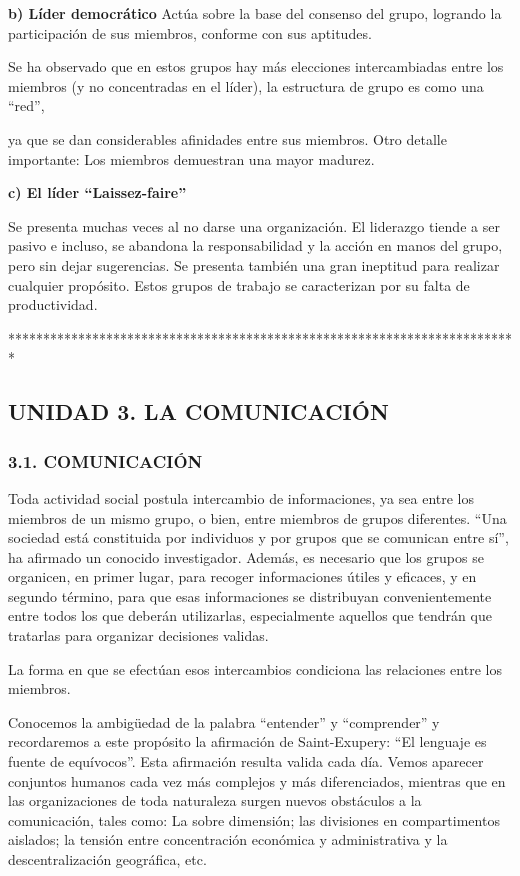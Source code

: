 \textbf{b) Líder democrático} Actúa sobre la base del consenso del grupo, logrando la participación de sus miembros, conforme con sus aptitudes.

Se ha observado que en estos grupos hay más elecciones intercambiadas entre los miembros (y no concentradas en el líder), la estructura de grupo es como una “red”,



ya que se dan considerables afinidades entre sus miembros. Otro detalle importante: Los miembros demuestran una mayor madurez.

\textbf{c) El líder “Laissez-faire”}

Se presenta muchas veces al no darse una organización. El liderazgo tiende a ser pasivo e incluso, se abandona la responsabilidad y la acción en manos del grupo, pero sin dejar sugerencias. Se presenta también una gran ineptitud para realizar cualquier propósito. Estos grupos de trabajo se caracterizan por su falta de productividad.

*************************************************************************



\subsection*{UNIDAD 3. LA COMUNICACIÓN}
\subsubsection*{3.1. COMUNICACIÓN}
Toda actividad social postula intercambio de informaciones, ya sea entre los miembros de un mismo grupo, o bien, entre miembros de grupos diferentes. “Una sociedad está constituida por individuos y por grupos que se comunican entre sí”, ha afirmado un conocido investigador. Además, es necesario que los grupos se organicen, en primer lugar, para recoger informaciones útiles y eficaces, y en segundo término, para que esas informaciones se distribuyan convenientemente entre todos los que deberán utilizarlas, especialmente aquellos que tendrán que tratarlas para organizar decisiones validas.

La forma en que se efectúan esos intercambios condiciona las relaciones entre los miembros.

Conocemos la ambigüedad de la palabra “entender” y “comprender” y recordaremos a este propósito la afirmación de Saint-Exupery: “El lenguaje es fuente de equívocos”. Esta afirmación resulta valida cada día. Vemos aparecer conjuntos humanos cada vez más complejos y más diferenciados, mientras que en las organizaciones de toda naturaleza surgen nuevos obstáculos a la comunicación, tales como: La sobre dimensión; las divisiones en compartimentos aislados; la tensión entre concentración económica y administrativa y la descentralización geográfica, etc.

